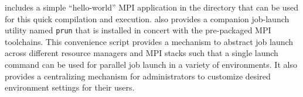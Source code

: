 \OHPC{} includes a simple ``hello-world'' MPI application in the
 directory that can be used for this
quick compilation and execution. \OHPC{} also provides a companion
job-launch utility named \texttt{prun} that is installed in concert
with the pre-packaged MPI toolchains. This convenience script provides
a mechanism to abstract job launch across different resource managers
and MPI stacks such that a single launch command can be
used for parallel job launch in a variety of \OHPC{} environments. It
also provides a centralizing mechanism for administrators to customize
desired environment settings for their users.

